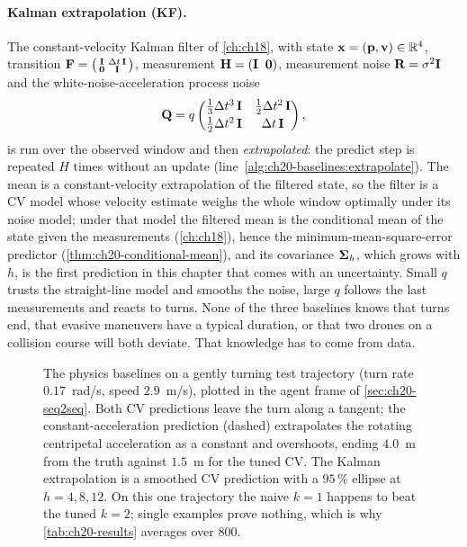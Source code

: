 \paragraph{Kalman extrapolation (KF).}
%
The constant-velocity Kalman filter of \cref{ch:ch18}, with state
$\mathbf{x} = (\mathbf{p}, \mathbf{v}) \in \mathbb{R}^4$, transition
$\mathbf{F} = \begin{psmallmatrix} \mathbf{I} & \Delta t\,\mathbf{I} \\ \mathbf{0} & \mathbf{I}
\end{psmallmatrix}$, measurement $\mathbf{H} = (\mathbf{I}\;\;\mathbf{0})$, measurement
noise $\mathbf{R} = \sigma^2\mathbf{I}$ and the white-noise-acceleration process
noise
\begin{equation}
  \mathbf{Q} = q \begin{pmatrix} \tfrac{1}{3}\Delta t^3\,\mathbf{I} & \tfrac{1}{2}\Delta t^2\,\mathbf{I} \\[2pt]
                              \tfrac{1}{2}\Delta t^2\,\mathbf{I} & \Delta t\,\mathbf{I} \end{pmatrix},
  \label{eq:ch20-q}
\end{equation}
is run over the observed window and then \emph{extrapolated}: the predict
step is repeated $H$ times without an update
(line~\ref{alg:ch20-baselines:extrapolate}). The mean is a constant-velocity
extrapolation of the filtered state, so the filter is a CV model whose
velocity estimate weighs the whole window optimally under its noise model;
under that model the filtered mean is the conditional mean of the state given
the measurements (\cref{ch:ch18}), hence the minimum-mean-square-error
predictor (\cref{thm:ch20-conditional-mean}), and its covariance
$\mathbf{\Sigma}_h$, which grows with $h$, is the first prediction in this
chapter that comes with an uncertainty. Small $q$ trusts the straight-line
model and smooths the noise, large $q$ follows the last measurements and
reacts to turns. None of the three baselines knows that turns end, that
evasive maneuvers have a typical duration, or that two drones on a collision
course will both deviate. That knowledge has to come from data.

\begin{figure}[tb]
  \centering
  \caption{The physics baselines on a gently turning test trajectory (turn
  rate $0.17$~rad/s, speed $2.9$~m/s), plotted in the agent frame of
  \cref{sec:ch20-seq2seq}. Both CV predictions leave the turn along a tangent;
  the constant-acceleration prediction (dashed) extrapolates the rotating
  centripetal acceleration as a constant and overshoots, ending $4.0$~m from
  the truth against $1.5$~m for the tuned CV. The Kalman extrapolation is a
  smoothed CV prediction with a $95\,\%$ ellipse at $h = 4, 8, 12$. On this
  one trajectory the naive $k = 1$ happens to beat the tuned $k = 2$; single
  examples prove nothing, which is why \cref{tab:ch20-results} averages
  over $800$.}
  \label{fig:ch20-baselines}
\end{figure}

